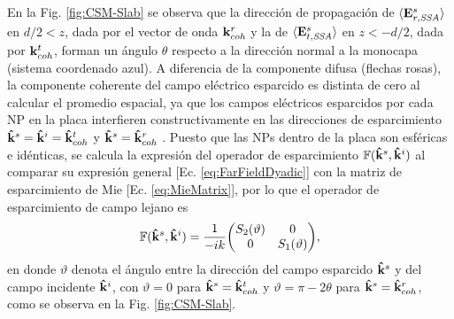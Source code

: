 En la Fig. \ref{fig:CSM-Slab} se observa que la dirección de propagación de  $\langle \vb{E}^s_{r,\textit{SSA}}\rangle$ en $d/2<z$, dada por el vector de onda $\vb{k}^r_{coh}$ y la de $\langle \vb{E}^s_{t,\textit{SSA}}\rangle$ en  $z<-d/2$, dada por $\vb{k}^t_{coh}$, forman un ángulo $\theta$ respecto a la dirección normal a la monocapa (sistema coordenado azul). A diferencia de la componente difusa (flechas rosas), la componente coherente del campo eléctrico esparcido es distinta de cero al calcular el promedio espacial, ya que los campos eléctricos esparcidos por cada NP en la placa interfieren constructivamente en las direcciones de esparcimiento $\vu{k}^s =\vu{k}^i=\vu{k}^t_{coh}$ y $\vu{k}^s =\vu{k}^r_{coh}$ \cite{garcia2012multiple}. Puesto que las NPs dentro de la placa son esféricas e idénticas, se calcula la expresión del operador de esparcimiento $\mathbb{F}(\vu{k}^s,\vu{k}^i)$ al comparar su expresión general [Ec. \eqref{eq:FarFieldDyadic}] con la matriz de esparcimiento de Mie [Ec. \eqref{eq:MieMatrix}], por lo que el operador de esparcimiento de campo lejano es
%
	\begin{align}
	\mathbb{F}(\vu{k}^s,\vu{k}^i) = \frac{1}{-ik} 
	 \mqty(S_2(\vartheta) & 0 \\ 0 & S_1(\vartheta)),
	 \label{eq:FFDydadic-Mie}
	\end{align}
%
en donde $\vartheta$ denota el ángulo entre la dirección del campo esparcido $\vu{k}^s$ y del campo incidente $\vu{k}^i$, con $\vartheta = 0$ para $\vu{k}^s = \vu{k}^t_{coh}$ y $\vartheta = \pi-2\theta$  para $\vu{k}^s = \vu{k}^r_{coh}$, como se observa en la Fig. \ref{fig:CSM-Slab}.
	
